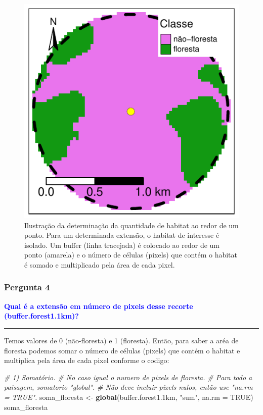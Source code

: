 \documentclass[
]{article}
\newenvironment{Shaded}{\begin{snugshade}}{\end{snugshade}}
\newcommand{\AttributeTok}[1]{\textcolor[rgb]{0.13,0.29,0.53}{#1}}
\newcommand{\CommentTok}[1]{\textcolor[rgb]{0.56,0.35,0.01}{\textit{#1}}}
\newcommand{\ConstantTok}[1]{\textcolor[rgb]{0.56,0.35,0.01}{#1}}
\newcommand{\FloatTok}[1]{\textcolor[rgb]{0.00,0.00,0.81}{#1}}
\newcommand{\FunctionTok}[1]{\textcolor[rgb]{0.13,0.29,0.53}{\textbf{#1}}}
\newcommand{\NormalTok}[1]{#1}
\newcommand{\OtherTok}[1]{\textcolor[rgb]{0.56,0.35,0.01}{#1}}
\newcommand{\StringTok}[1]{\textcolor[rgb]{0.31,0.60,0.02}{#1}}
\begin{document}
\begin{figure}
\centering
\includegraphics{epr_files/figure-latex/unnamed-chunk-14-1.pdf}
\caption{\label{fig:unnamed-chunk-14}Ilustração da determinação da quantidade de habitat ao redor de um ponto. Para um determinada extensão, o habitat de interesse é isolado. Um buffer (linha tracejada) é colocado ao redor de um ponto (amarela) e o número de células (pixels) que contém o habitat é somado e multiplicado pela área de cada pixel.}
\end{figure}

\hypertarget{pergunta-4}{%
\subsubsection{Pergunta 4}\label{pergunta-4}}

\textcolor{blue}{\textbf{Qual é a extensão em número de pixels desse recorte (buffer.forest1.1km)?}}

\begin{center}\rule{0.5\linewidth}{0.5pt}\end{center}

\newpage

Temos valores de 0 (não-floresta) e 1 (floresta). Então, para saber a aréa de floresta podemos somar o número de células (pixels) que contém o habitat e multiplica pela área de cada pixel conforme o codigo:

\begin{Shaded}
\begin{Highlighting}[]
\CommentTok{\# 1) Somatório. }
\CommentTok{\# No caso igual o numero de pixels de floresta. }
\CommentTok{\# Para todo a paisagem, somatorio "global".}
\CommentTok{\# Não deve incluir pixels nulos, então use "na.rm = TRUE".}
\NormalTok{soma\_floresta }\OtherTok{\textless{}{-}} \FunctionTok{global}\NormalTok{(buffer.forest1}\FloatTok{.1}\NormalTok{km, }\StringTok{"sum"}\NormalTok{, }\AttributeTok{na.rm =} \ConstantTok{TRUE}\NormalTok{) }
\NormalTok{soma\_floresta}
\end{Highlighting}
\end{Shaded}
\end{document}
